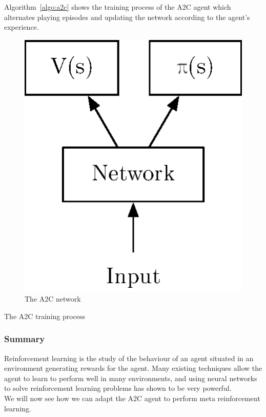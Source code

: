 Algorithm~\ref{algo:a2c} shows the training
process of the A2C agent which alternates playing episodes and updating the
network according to the agent's experience.

\begin{figure}[]
	\centering
	\includegraphics[width=0.2\linewidth]{fig/a3c.eps}
	\caption{The A2C network}
	\label{fig:a2c}
\end{figure}

\begin{algorithm}
\caption{The A2C training process}
\label{algo:a2c}
\begin{algorithmic}[1]
	\Statex
	\EndWhile
	\Statex
	\EndFor
	\Statex
\EndWhile

\end{algorithmic}
\end{algorithm}

\subsubsection{Summary}
Reinforcement learning is the study of the behaviour of an agent situated in
an environment generating rewards for the agent. Many existing techniques
allow the agent to learn to perform well in many environments, and 
using neural networks to solve reinforcement learning problems has shown
to be very powerful.\\

We will now see how we can adapt the A2C agent to perform meta reinforcement
learning.


